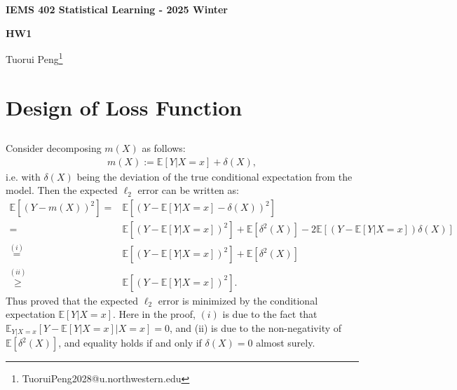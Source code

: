 \documentclass[11pt,a4paper]{ctexart}
\numberwithin{equation}{section}%
\begin{document}
\begin{center}\thispagestyle{plain}

{\LARGE\textbf{IEMS 402 Statistical Learning - 2025 Winter}}

{\Large\textbf{HW1}}

Tuorui Peng\footnote{TuoruiPeng2028@u.northwestern.edu}
\end{center}

\thispagestyle{myheadings}
\pagestyle{myheadings}



\section{Design of Loss Function}

\subsection{}

Consider decomposing $ m(X) $ as follows:
\begin{align*}
    m(X):= \mathbb{E}\left[ Y|X=x \right] + \delta (X),  
\end{align*}
i.e. with $ \delta (X) $ being the deviation of the true conditional expectation from the model. Then the expected $ \ell_2 $ error can be written as:
\begin{align*}
    \mathbb{E}\left[ (Y-m(X))^2 \right]=& \mathbb{E}\left[ (Y-\mathbb{E}\left[ Y|X=x \right] - \delta (X))^2 \right] \\
    =& \mathbb{E}\left[ (Y-\mathbb{E}\left[ Y|X=x \right])^2 \right] + \mathbb{E}\left[ \delta^2(X) \right] - 2\mathbb{E}\left[ (Y-\mathbb{E}\left[ Y|X=x \right])\delta(X) \right] \\  
    \mathop{ = }\limits^{(i)} &  \mathbb{E}\left[ (Y-\mathbb{E}\left[ Y|X=x \right])^2 \right] + \mathbb{E}\left[ \delta^2(X) \right] \\
    \mathop{ \geq  }\limits^{(ii)}  & \mathbb{E}\left[ (Y-\mathbb{E}\left[ Y|X=x \right])^2 \right] .
\end{align*}
Thus proved that the expected $ \ell_2 $ error is minimized by the conditional expectation $ \mathbb{E}\left[ Y|X=x \right]  $. Here in the proof, $ (i) $ is due to the fact that $ \mathbb{E}_{Y|X=x}\left[ Y-\mathbb{E}\left[ Y|X=x \right] \big| X=x\right] = 0 $, and (ii) is due to the non-negativity of $ \mathbb{E}\left[ \delta^2(X) \right] $, and equality holds if and only if $ \delta(X) = 0 $ almost surely.
\end{document}
